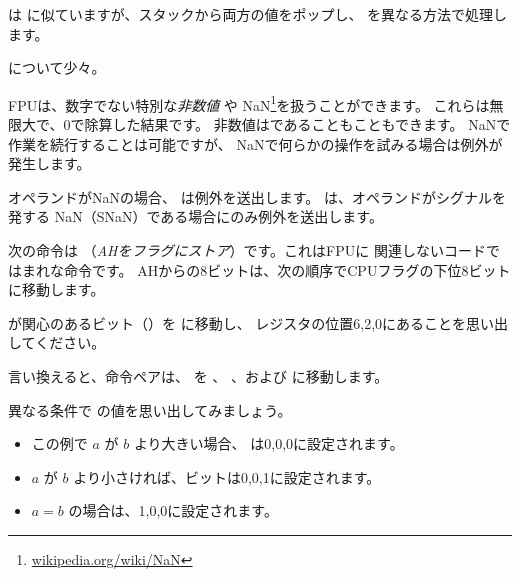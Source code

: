 ﻿




\FUCOMPP{} は \FCOM に似ていますが、スタックから両方の値をポップし、
 を異なる方法で処理します。

 について少々。

\newcommand{\NANFN}{\footnote{\href{http://go.yurichev.com/17130}{wikipedia.org/wiki/NaN}}}

FPUは、数字でない特別な\emph{非数値} や \gls{NaN}\NANFN を扱うことができます。 
これらは無限大で、0で除算した結果です。
非数値はであることもこともできます。 NaNで
作業を続行することは可能ですが、 NaNで何らかの操作を試みる場合は例外が発生します。


オペランドが\gls{NaN}の場合、 \FCOM は例外を送出します。 
\FUCOM は、オペランドがシグナルを発する \gls{NaN}（SNaN）である場合にのみ例外を送出します。

\label{SAHF}

次の命令は \SAHF （\emph{AHをフラグにストア}）です。これはFPUに
関連しないコードではまれな命令です。
AHからの8ビットは、次の順序でCPUフラグの下位8ビットに移動します。




\FNSTSW が関心のあるビット（\CThreeBits）を \AH に移動し、
\AH レジスタの位置6,2,0にあることを思い出してください。



言い換えると、命令ペアは、 \CThreeBits を \ZF 、 \PF 、および \CF に移動します。

異なる条件で \CThreeBits の値を思い出してみましょう。

\begin{itemize}
\item この例で $a$ が $b$ より大きい場合、 \CThreeBits は0,0,0に設定されます。
\item $a$ が $b$ より小さければ、ビットは0,0,1に設定されます。
\item $a=b$ の場合は、1,0,0に設定されます。
\end{itemize}

